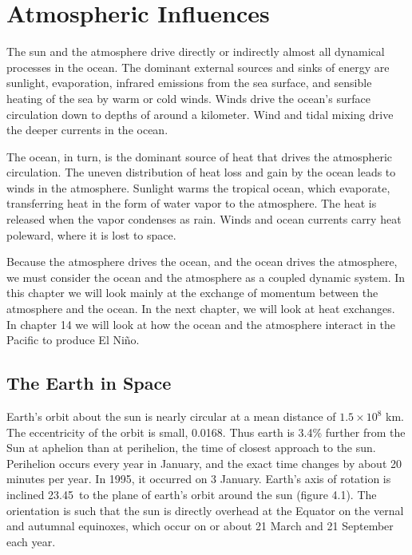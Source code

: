 \chapter{Atmospheric Influences} 

The sun and the atmosphere drive directly or indirectly
almost all dynamical processes in the ocean. The dominant external
sources and sinks of energy are sunlight, evaporation, infrared
emissions from the sea surface, and sensible heating of the sea by
warm or cold winds. Winds drive the ocean's surface circulation down
to depths of around a kilometer. Wind and tidal
mixing drive the deeper currents in the ocean.

The ocean, in turn, is the dominant source of heat that drives the
atmospheric circulation. The uneven distribution of heat loss and gain by the ocean
leads to winds in the atmosphere.  Sunlight warms the tropical ocean,
which evaporate, transferring heat in the form of water vapor to the
atmosphere. The heat is released when the vapor condenses as
rain. Winds and ocean currents carry heat poleward, where it is lost
to space.

Because the atmosphere drives the ocean, and the ocean drives the
atmosphere, we must consider the ocean and the atmosphere as a coupled
dynamic system. In this chapter we will look mainly at the exchange of
momentum between the atmosphere and the ocean. In the next chapter, we
will look at heat exchanges. In chapter 14 we will look at how the
ocean and the atmosphere interact in the Pacific to produce El
Ni\~{n}o.

\section{The Earth in Space}
Earth's orbit about the sun is nearly
circular at a mean distance of \(1.5 \times 10^8\) km. The
eccentricity of the orbit is small, 0.0168.  Thus earth is 3.4\%
further from the Sun at aphelion than at perihelion, the
time of closest approach to the sun. Perihelion occurs every year in
January, and the exact time changes by about 20 minutes per year. In
1995, it occurred on 3 January. Earth's axis of rotation is inclined
23.45\degrees\ to the plane of earth's orbit around the sun
(figure 4.1). The orientation is such that the sun
is directly overhead at the Equator on the vernal and autumnal
equinoxes, which occur on or about 21 March and 21 September each
year.

